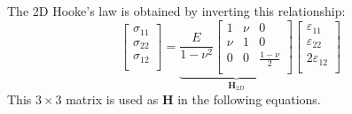 \documentclass[10pt,xcolor=pdftex,dvipsnames,table]{beamer}
\begin{document}
\begin{frame}
	The 2D Hooke's law is obtained by inverting this relationship:
	\begin{equation*}	
		\begin{bmatrix}
			\sigma_{11} \\
			\sigma_{22} \\
			\sigma_{12} \\
		\end{bmatrix}	
		= \underbrace{\frac{E}{1-\nu^2}
		\begin{bmatrix}
			1 & \nu &  0 \\
			\nu & 1 &  0 \\
			0  & 0 & \frac{1-\nu}{2}  \\
		\end{bmatrix}	}_{\boldsymbol{H}_{2D}}	
		\begin{bmatrix}
			\varepsilon_{11} \\
			\varepsilon_{22} \\
			2\varepsilon_{12} \\
		\end{bmatrix}			
	\end{equation*}		
	This $3\times 3$ matrix is used as $\boldsymbol{H}$ in the following equations.

\end{frame}
\end{document}
